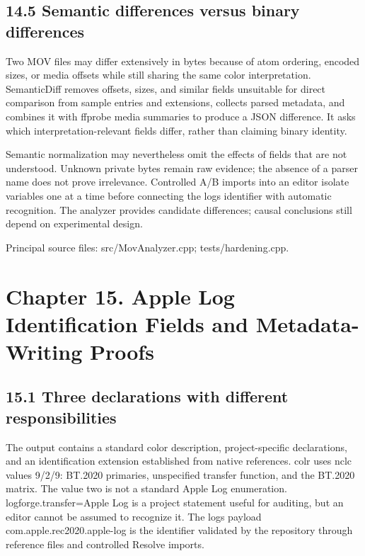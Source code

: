 \documentclass[11pt,a4paper,openany]{book}
\begin{document}
\section*{14.5 Semantic differences versus binary differences}
Two MOV files may differ extensively in bytes because of atom ordering, encoded sizes, or media offsets while still sharing the same color interpretation. SemanticDiff removes offsets, sizes, and similar fields unsuitable for direct comparison from sample entries and extensions, collects parsed metadata, and combines it with ffprobe media summaries to produce a JSON difference. It asks which interpretation-relevant fields differ, rather than claiming binary identity.

Semantic normalization may nevertheless omit the effects of fields that are not understood. Unknown private bytes remain raw evidence; the absence of a parser name does not prove irrelevance. Controlled A/B imports into an editor isolate variables one at a time before connecting the logs identifier with automatic recognition. The analyzer provides candidate differences; causal conclusions still depend on experimental design.


\par\small Principal source files: src/MovAnalyzer.cpp; tests/hardening.cpp.\normalsize

\chapter*{Chapter 15. Apple Log Identification Fields and Metadata-Writing Proofs}

\section*{15.1 Three declarations with different responsibilities}
The output contains a standard color description, project-specific declarations, and an identification extension established from native references. colr uses nclc values 9/2/9: BT.2020 primaries, unspecified transfer function, and the BT.2020 matrix. The value two is not a standard Apple Log enumeration. logforge.transfer=Apple Log is a project statement useful for auditing, but an editor cannot be assumed to recognize it. The logs payload com.apple.rec2020.apple-log is the identifier validated by the repository through reference files and controlled Resolve imports.
\end{document}
